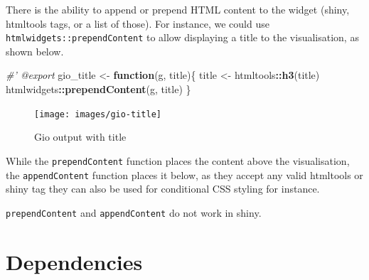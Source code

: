 \documentclass[10pt,]{krantz}
\makeatletter
\newenvironment{Shaded}{\begin{snugshade}}{\end{snugshade}}
\newcommand{\CommentTok}[1]{\textcolor[rgb]{0.37,0.37,0.37}{\textit{#1}}}
\newcommand{\ControlFlowTok}[1]{\textcolor[rgb]{0.27,0.27,0.27}{\textbf{#1}}}
\newcommand{\KeywordTok}[1]{\textcolor[rgb]{0.27,0.27,0.27}{\textbf{#1}}}
\newcommand{\NormalTok}[1]{#1}
\newcommand{\OperatorTok}[1]{\textcolor[rgb]{0.43,0.43,0.43}{\textbf{#1}}}
\newcommand{\StringTok}[1]{\textcolor[rgb]{0.5,0.5,0.5}{#1}}
\newenvironment{kframe}{%
\medskip{}
\setlength{\fboxsep}{.8em}
 \def\at@end@of@kframe{}%
 \ifinner\ifhmode%
  \def\at@end@of@kframe{\end{minipage}}%
  \begin{minipage}{\columnwidth}%
 \fi\fi%
 \def\FrameCommand##1{\hskip\@totalleftmargin \hskip-\fboxsep
 \colorbox{shadecolor}{##1}\hskip-\fboxsep
     \hskip-\linewidth \hskip-\@totalleftmargin \hskip\columnwidth}%
 \MakeFramed {\advance\hsize-\width
   \@totalleftmargin\z@ \linewidth\hsize
   \@setminipage}}%
 {\par\unskip\endMakeFramed%
 \at@end@of@kframe}
\renewenvironment{Shaded}{\begin{kframe}}{\end{kframe}}
\newenvironment{rmdblock}[1]
  {
  \begin{itemize}
  \renewcommand{\labelitemi}{
    \raisebox{-.7\height}[0pt][0pt]{
      {\setkeys{Gin}{width=3em,keepaspectratio}\texttt{[image: images/\#1]}}
    }
  }
  \setlength{\fboxsep}{1em}
  \begin{kframe}
  \item
  }
  {
  \end{kframe}
  \end{itemize}
  }
\newenvironment{rmdnote}
  {\begin{rmdblock}{note}}
  {\end{rmdblock}}
\makeatother
\begin{document}
There is the ability to append or prepend HTML content to the widget (shiny, htmltools tags, or a list of those). For instance, we could use \texttt{htmlwidgets::prependContent} to allow displaying a title to the visualisation, as shown below.

\begin{Shaded}
\begin{Highlighting}[]
\CommentTok{#' @export}
\NormalTok{gio_title <-}\StringTok{ }\ControlFlowTok{function}\NormalTok{(g, title)\{}
\NormalTok{  title <-}\StringTok{ }\NormalTok{htmltools}\OperatorTok{::}\KeywordTok{h3}\NormalTok{(title)}
\NormalTok{  htmlwidgets}\OperatorTok{::}\KeywordTok{prependContent}\NormalTok{(g, title)}
\NormalTok{\}}
\end{Highlighting}
\end{Shaded}

\begin{Shaded}
\end{Shaded}

\begin{figure}[H]

{\centering \texttt{[image: images/gio-title]} 

}

\caption{Gio output with title}\label{fig:gio-title}
\end{figure}

While the \texttt{prependContent} function places the content above the visualisation, the \texttt{appendContent} function places it below, as they accept any valid htmltools or shiny tag they can also be used for conditional CSS styling for instance.

\begin{rmdnote}
\texttt{prependContent} and \texttt{appendContent} do not work in shiny.
\end{rmdnote}

\hypertarget{widgets-adv-dependencies}{%
\section{Dependencies}\label{widgets-adv-dependencies}}
\end{document}
